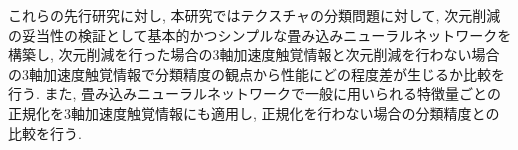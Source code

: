  これらの先行研究に対し, 本研究ではテクスチャの分類問題に対して, 次元削減の妥当性の検証として基本的かつシンプルな畳み込みニューラルネットワークを構築し, 次元削減を行った場合の3軸加速度触覚情報と次元削減を行わない場合の3軸加速度触覚情報で分類精度の観点から性能にどの程度差が生じるか比較を行う. また, 畳み込みニューラルネットワークで一般に用いられる特徴量ごとの正規化を3軸加速度触覚情報にも適用し, 正規化を行わない場合の分類精度との比較を行う.

